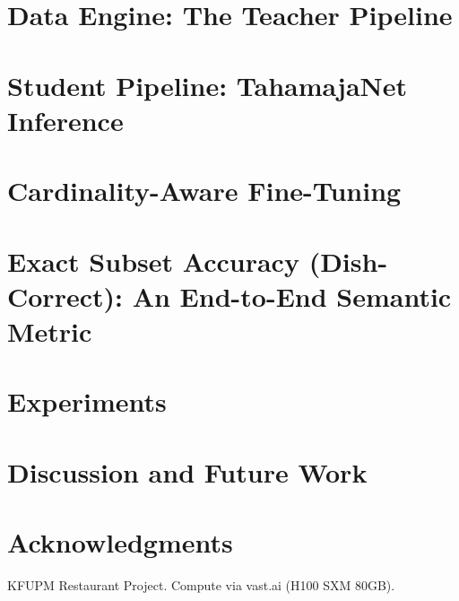 \documentclass[10pt,twocolumn,letterpaper]{article}
\begin{document}
\section{Data Engine: The Teacher Pipeline}
\label{sec:dataengine}



\section{Student Pipeline: TahamajaNet Inference}
\label{sec:student}



\section{Cardinality-Aware Fine-Tuning}
\label{sec:cardinality}



\section{Exact Subset Accuracy (Dish-Correct): An End-to-End Semantic Metric}
\label{sec:metric}



\section{Experiments}
\label{sec:experiments}



\section{Discussion and Future Work}
\label{sec:discussion}



\section*{Acknowledgments}
KFUPM Restaurant Project. Compute via vast.ai (H100 SXM 80GB).
\end{document}
